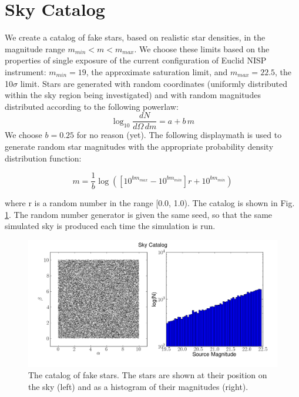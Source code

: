 \documentclass[manuscript]{aastex}
\begin{document}
\section{Sky Catalog}
We create a catalog of fake stars, based on realistic star densities, in the magnitude range $m_{min} < m < m_{max}$. We choose these limits based on the properties of single exposure of the current configuration of Euclid NISP instrument: $m_{min} = 19$, the approximate saturation limit, and $m_{max} = 22.5$, the 10$\sigma$ limit. Stars are generated with random coordinates (uniformly distributed within the sky region being investigated) and with random magnitudes distributed according to the following powerlaw:
\begin{displaymath}
\log_{10} \frac{dN}{d\Omega\,dm} = a + b\,m
\end{displaymath}
We choose $b = 0.25$ for no reason (yet).
The following displaymath is used to generate random star magnitudes with the appropriate probability density distribution function:

\begin{displaymath}
m = \frac{1}{b} \log{(\left[ 10^{b m_{max}} - 10^{b m_{min}} \right] r + 10^{b m_{min}})}
\end{displaymath}

\noindent{}where r is a random number in the range [0.0, 1.0). The catalog is shown in Fig. \ref{fig:sky}. The random number generator is given the same seed, so that the same simulated sky is produced each time the simulation is run.

\begin{figure}[ht]
\begin{center}
\includegraphics[width=\textwidth]{Catalog.png}
\end{center}
\caption{The catalog of fake stars. The stars are shown at their position on the sky (left) and as a histogram of their magnitudes (right).
\label{fig:sky}}
\end{figure}
\end{document}
